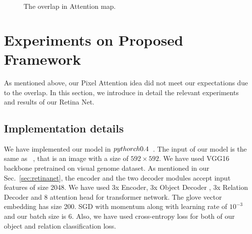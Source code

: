 \begin{figure}[tbph!]
{\begin{minipage}[t]{5cm}
			\label{fig:motor_all1}
	\end{minipage}}
	
	\caption[The overlap in Attention map]{The overlap in Attention map.}
	\label{fig:overlap}
\end{figure}



\section{Experiments on Proposed Framework}

As mentioned above, our Pixel Attention idea did not meet our expectations due to the overlap. In this section, we introduce in detail the relevant experiments and results of our Retina Net.

\subsection{Implementation details}
We have implemented our model in $ pythorch\-0.4 $~\cite{paszke2019pytorch}. The input of our model is the same as~\cite{zellers2018neural} , that is an image with a size of $ 592 \times 592 $. We have used VGG16~\cite{simonyan2015deep} backbone pretrained on visual genome dataset. As mentioned in our Sec.~\ref{sec:retinanet}, the encoder and the two decoder modules accept input features of size 2048. We have used 3x Encoder, 3x Object Decoder , 3x Relation Decoder and 8 attention head for transformer network. The glove vector embedding has size 200. SGD with momentum along with learning rate of $ 10^{-3 }$ and our batch size is 6. Also, we have used cross-entropy loss for both of our object and relation classification loss.


